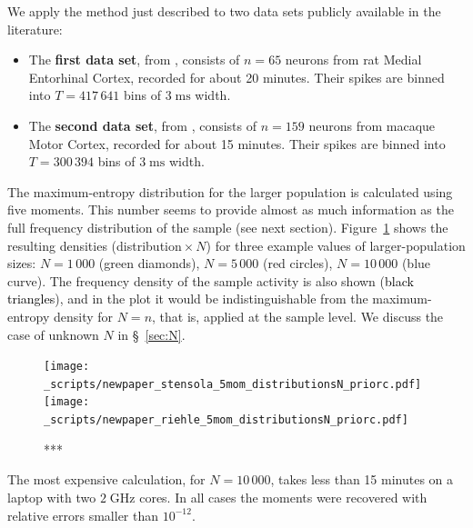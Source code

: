 \documentclass[\ifafour a4paper,12pt,\else a5paper,10pt,\fi%
onecolumn,oneside,article,%
british%
]{memoir}
\theoremstyle{remark}
\theoremstyle{innote}
\renewcommand*{\|}{\nonscript\,\vert\nonscript\;\mathopen{}}
\newcommand*{\sect}{\S}%
\newcommand*{\yAv}{A}
\newcommand*{\yA}{\yAv}%
\newcommand*{\px}{P_{\text{me}}}
\begin{document}
We apply the method just described to two data sets publicly available in
the literature:
\begin{itemize}[wide]
\item The \textbf{first data set}, from \textcite[rat
  14147]{stensolaetal2012}, consists of $n=65$ neurons from rat Medial
  Entorhinal Cortex, recorded for about 20 minutes. Their spikes are binned
  into $T=417\,641$ bins of $3\;\textrm{ms}$ width.
\item The \textbf{second data set}, from \textcite[data courtesy by A.
  Riehle and T. Brochier]{rostamietal2016_r2017}, %
  consists of $n=159$ neurons from macaque Motor Cortex, recorded for about
  15 minutes. Their spikes are binned into $T=300\,394$ bins of
  $3\;\textrm{ms}$ width.
\end{itemize}


\bigskip

The maximum-entropy distribution for the larger population is calculated
using five moments. This number seems to provide almost as much information
as the full frequency distribution of the sample (see next section).
Figure~\ref{fig:plots_5mom} shows the resulting densities
(distribution${}\times N$) for three example values of larger-population
sizes: $N=1\,000$ (\textcolor{mygreen}{green diamonds}), $N=5\,000$
(\textcolor{myred}{red circles}), $N=10\,000$ (\textcolor{myblue}{blue
  curve}). The frequency density of the sample activity is also shown
(\textcolor{black}{black triangles}), and in the plot it would be
indistinguishable from the maximum-entropy density for $N=n$, that is,
applied at the sample level. We discuss the case of unknown $N$ in
\sect~\ref{sec:N}.
\begin{figure}[!p]
\centering
\texttt{[image: \_scripts/newpaper\_stensola\_5mom\_distributionsN\_priorc.pdf]}%
\\[3em]%
\texttt{[image: \_scripts/newpaper\_riehle\_5mom\_distributionsN\_priorc.pdf]}%
\caption{***}
\label{fig:plots_5mom}
\end{figure}

The most expensive calculation, for $N=10\,000$, takes less than 15 minutes
on a laptop with two $2\;\textrm{GHz}$ cores. In all cases the moments were
recovered with relative errors smaller than $10^{-12}$.
\end{document}
